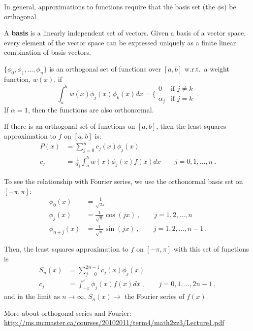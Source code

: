 \documentclass[12pt]{article}
\begin{document}
In general, approximations to functions require that the basis set (the $\phi$s) be orthogonal. 

A \textbf{basis} is a linearly independent set of vectors. Given a basis of a vector space, every element of the vector space can be expressed uniquely as a finite linear combination of basis vectors.

$\{ \phi_0, \phi_1, \dots, \phi_n\}$ is an orthogonal set of functions over $[a,b]$ w.r.t.\ a weight function, $w(x)$, if
%
\begin{equation}
\int_a^b w(x) \phi_j(x) \phi_k(x) dx = \biggl\{
\begin{array}{ll}
0 & \mbox{if } j \neq k \\
\alpha_j & \mbox{if } j = k
\end{array}\:. \nonumber
\end{equation}
%
If $\alpha = 1$, then the functions are also orthonormal.

If there is an orthogonal set of functions on $[a,b]$, then the least squares approximation to $f$ on $[a,b]$ is:
\begin{align*}
P(x) &= \sum_{j=0}^n c_j(x) \phi_j(x) \\
c_j &= \frac{1}{\alpha_j} \int_a^b w(x)\phi_j(x)f(x)dx \qquad j=0, 1, \dots, n\:.
\end{align*}

To see the relationship with Fourier series, we use the orthonormal basis set on $[-\pi, \pi]$:
%
\begin{align*}
\phi_0(x) &= \frac{1}{\sqrt{2\pi}} \\
\phi_j(x) &= \frac{1}{\sqrt{\pi}}\cos(jx)\:, \qquad j=1,2,\dots,n \\
\phi_{n+j}(x) &= \frac{1}{\sqrt{\pi}}\sin(jx)\:, \qquad j=1,2,\dots,n-1 \:.
\end{align*}

Then, the least squares approximation to $f$ on $[-\pi,\pi]$ with this set of functions is
%
\begin{align*}
S_n(x) &= \sum_{j=0}^{2n-1} c_j(x) \phi_j(x) \\
c_j &= \int_{-\pi}^{\pi} \phi_j(x)f(x)dx \:, \qquad j=0, 1, \dots, 2n-1 \:,
\end{align*}
%
and in the limit as $n \rightarrow \infty$, $S_n(x) \rightarrow$ the Fourier series of $f(x)$.  

More about orthogonal series and Fourier:\\ \href{http://ms.mcmaster.ca/courses/20102011/term4/math2zz3/Lecture1.pdf}{http://ms.mcmaster.ca/courses/20102011/term4/math2zz3/Lecture1.pdf}


%
% 
\end{document}
